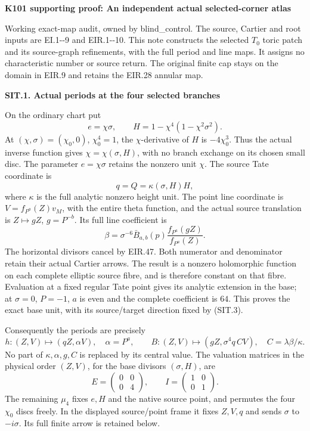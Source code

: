 \par\bigskip\noindent\textbf{K101 supporting proof: An independent actual selected-corner atlas}\par\nobreak
Working exact-map audit, owned by blind\_control. The source, Cartier
and root inputs are EI.1-\/-9 and EIR.1-\/-10. This note constructs the
selected \(T_0\) toric patch and its source-graph refinements, with
the full period and line maps. It assigns no characteristic number
or source return. The original finite cap stays on the domain in
EIR.9 and retains the EIR.28 annular map.

\par

\medskip\noindent\textbf{SIT.1. Actual periods at the four selected branches}

\par\nobreak

On the ordinary chart put
\[
 e=\chi\sigma,\qquad
 H=1-\chi^4(1-\chi^2\sigma^2).
 \tag{SIT.1}
\]
At \((\chi,\sigma)=(\chi_0,0)\), \(\chi_0^4=1\), the
\(\chi\)-derivative of \(H\) is \(-4\chi_0^3\). Thus the actual
inverse function gives \(\chi=\chi(\sigma,H)\), with no branch
exchange on its chosen small disc. The parameter \(e=\chi\sigma\)
retains the nonzero unit \(\chi\). The source Tate coordinate is
\[
 q=Q=\kappa(\sigma,H)H ,
 \tag{SIT.2}
\]
where \(\kappa\) is the full analytic nonzero height unit. The point
line coordinate is \(V=f_{P^a}(Z)v_M\), with the entire theta
function, and the actual source translation is \(Z\mapsto gZ\),
\(g=P^{-b}\). Its full line coefficient is
\[
 \beta=\sigma^{-6}\bar B_{a,b}(p)
       \frac{f_{P^a}(gZ)}{f_{P^a}(Z)} .
 \tag{SIT.3}
\]
The horizontal divisors cancel by EIR.47. Both numerator and
denominator retain their actual Cartier arrows. The result is a
nonzero holomorphic function on each complete elliptic source
fibre, and is therefore constant on that fibre. Evaluation at a
fixed regular Tate point gives its analytic extension in the
base; at \(\sigma=0\), \(P=-1\), \(a\) is even and the complete
coefficient is \(64\). This proves the exact base unit, with its
source/target direction fixed by (SIT.3).

Consequently the periods are precisely
\[
 h:(Z,V)\longmapsto(qZ,\alpha V),\quad \alpha=P^a,
\qquad
 B:(Z,V)\longmapsto(gZ,\sigma^4q\,C V),\quad
 C=\lambda\beta/\kappa .
 \tag{SIT.4}
\]
No part of \(\kappa,\alpha,g,C\) is replaced by its central value.
The valuation matrices in the physical order \((Z,V)\), for the
base divisors \((\sigma,H)\), are
\[
 E=\begin{pmatrix}0&0\\0&4\end{pmatrix},
 \qquad I=\begin{pmatrix}1&0\\0&1\end{pmatrix}.
 \tag{SIT.5}
\]
The remaining \(\mu_4\) fixes \(e,H\) and the native source point,
and permutes the four \(\chi_0\) discs freely. In the displayed
source/point frame it fixes \(Z,V,q\) and sends \(\sigma\) to
\(-i\sigma\). Its full finite arrow is retained below.

